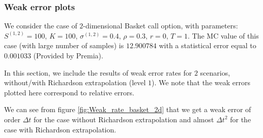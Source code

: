 \subsubsection{Weak error plots} \label{sec:Weak error plots_Basket_2D_call}

We consider the case of $2$-dimensional Basket call option, with parameters: $S^{(1,2)}=100$, $K=100$, $\sigma^{(1,2)}=0.4$, $\rho=0.3$, $r=0$, $T=1$.  The MC  value of this case (with large number of samples) is $12.900784$ with a statistical error equal to $	0.001033$ (Provided by Premia).


In this section, we include the results of weak error rates for $2$ scenarios, without/with Richardson extrapolation (level $1$). We note that the weak errors plotted here correspond to relative errors.  

 We can see from figure \ref{fig:Weak_rate_basket_2d} that we get a weak error of order $\Delta t$ for the case without Richardson extrapolation and almost $\Delta t^2$ for the case with Richardson extrapolation. 
 



